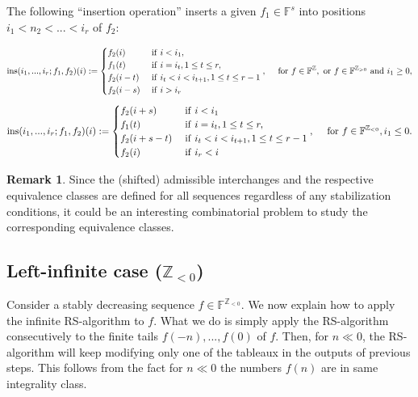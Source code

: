 \documentclass[10pt]{amsart}\oddsidemargin -1mm \evensidemargin -1mm \topmargin -15mm\headheight5mm \headsep 3.5mm \textheight 245mm\textwidth 170mm
\theoremstyle{definition}\newtheorem{theorem}{Theorem}[section]\newtheorem{lemma}[theorem]{Lemma}\newtheorem{remark}[theorem]{Remark}\newtheorem{proposition}[theorem]{Proposition}\newtheorem{corollary}[theorem]{Corollary}\newtheorem{definition}[theorem]{Definition}\newtheorem{Ex}[theorem]{Example}\newtheorem{obs}[theorem]{Observation}\newtheorem{nota}[theorem]{Notation}
\begin{document}
The following ``insertion operation'' inserts a given $f_1\in\mathbb F^s$ into positions $i_1<n_2<...<i_r$ of $f_2$:

$${\rm ins}(i_1,..., i_r; f_1, f_2)(i):=
\begin{cases}f_2(i)&{\rm~if~}i< i_1,
\\f_1(t)&{\rm~if~}i=i_t, 1\le t\le r,
\\f_2(i-t)&{\rm~if~}i_t<i<i_{t+1}, 1\le t\le r-1
\\f_2(i-s)&{\rm~if~}i>i_r\end{cases},\hspace{10pt}{\rm~for~}f\in\mathbb F^{\mathbb Z},\mbox{~or~}f\in\mathbb F^{\mathbb Z_{>0}}\mbox{~and~}i_1\ge0,$$
$${\rm ins}(i_1,..., i_r; f_1, f_2)(i):=
\begin{cases} f_2(i+s)&{\rm~if~}i<i_1
\\f_1(t)&{\rm~if~}i=i_t, 1\le t\le r,
\\f_2(i+s-t)&{\rm~if~}i_t<i<i_{t+1}, 1\le t\le r-1
\\f_2(i)&{\rm~if~}i_r<i\end{cases},\hspace{10pt}{\rm~for~}f\in\mathbb F^{\mathbb Z_{<0}}, i_1\le0.$$
\begin{remark} Since the (shifted) admissible interchanges  and the respective equivalence classes are defined for all sequences regardless of any stabilization conditions, it could be an interesting combinatorial problem to study the corresponding equivalence classes. \end{remark}

\subsection{{\bf Left-infinite case ($\mathbb Z_{<0}$)}} Consider a stably decreasing sequence $f\in\mathbb F^{\mathbb Z_{<0}}$.  
We now explain how to apply the infinite RS-algorithm to $f$. 
What we do is simply apply the RS-algorithm consecutively to the finite tails $f(-n),..., f(0)$ of $f$.  
Then, for $n\ll0$, the RS-algorithm will keep modifying only one of the tableaux in the outputs of previous steps. 
This follows from the fact for $n\ll0$ the numbers $f(n)$ are in same integrality class.
\end{document}
